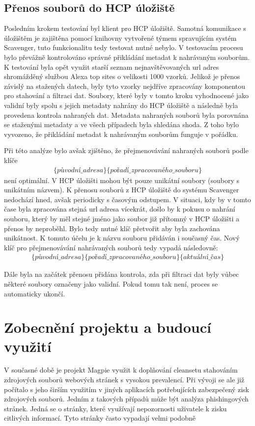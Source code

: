 \documentclass[thesis=M,czech,hidelinks]{FITthesis}[2013/05/06]
\begin{document}
\subsection{Přenos souborů do HCP úložiště}
Posledním krokem testování byl klient pro HCP úložiště. Samotná komunikace s úložištěm je zajištěna pomocí knihovny vytvořené týmem spravujícím systém Scavenger, tuto funkcionalitu tedy testovat nutné nebylo. V testovacím procesu bylo převážně kontrolováno správné přikládání metadat k nahrávaným souborům. K testování byla opět využit starší seznam nejnavštěvovaných url adres shromážděný službou Alexa top sites\cite{alexa} o velikosti 1000 vzorků. Jelikož je přenos závislý na stažených datech, byly tyto vzorky nejdříve zpracovány komponentou pro stahování a filtraci dat. Soubory, které byly v tomto kroku vyhodnocené jako validní byly spolu s jejich metadaty nahrány do HCP úložiště a následně byla provedena kontrola nahraných dat. Metadata nahraných souborů byla porovnána se staženými metadaty a ve všech případech byla shledána shoda. Z toho bylo vyvozeno, že přikládání metadat k nahrávaným souborům funguje v pořádku. 

Při této analýze bylo avšak zjištěno, že přejmenovávání nahraných souborů podle klíče
\begin{eqnarray}\label{prej}
\{původní\_ adresa\}\{pořadí\_ zpracovaného\_ souboru\}
\end{eqnarray}
 není optimální. V HCP úložišti mohou být pouze unikátní soubory (soubory s unikátním názvem). K přenosu souborů z HCP úložiště do systému Scavenger nedochází hned, avšak periodicky s časovým odstupem. V situaci, kdy by v tomto čase byla zpracována stejná url adresa vícekrát, došlo by k pokusu o nahrání souboru, který by měl stejné jméno jako soubor již přítomný v HCP úložišti a přenos by neproběhl. Bylo tedy nutné klíč přetvořit aby byla zachována unikátnost. K tomuto účelu je k názvu souboru přidáván i současný čas. Nový klíč pro přejmenovávání nahrávaných souborů tedy vypadá následovně: 
\begin{eqnarray}\label{prejm}
\{původní\_ adresa\}\{pořadí\_ zpracovaného\_ souboru\}\{aktuální\_čas\}
\end{eqnarray}

Dále byla na začátek přenosu přidána kontrola, zda při filtraci dat byly vůbec některé soubory označeny jako validní. Pokud tomu tak není, proces se automaticky ukončí.

\section{Zobecnění projektu a budoucí využití}
V současné době je projekt Magpie využit k doplňování cleansetu stahováním zdrojových souborů webových stránek s vysokou prevalencí. Při vývoji se ale již počítalo s jeho širším využitím v jiných aplikacích potřebujících zabezpečený zisk zdrojových souborů. Jedním z takových případů může být analýza phishingových stránek. Jedná se o stránky, které využívají nepozornosti uživatele k zisku citlivých informací. Tyto stránky často vypadají velmi podobně 
\end{document}
